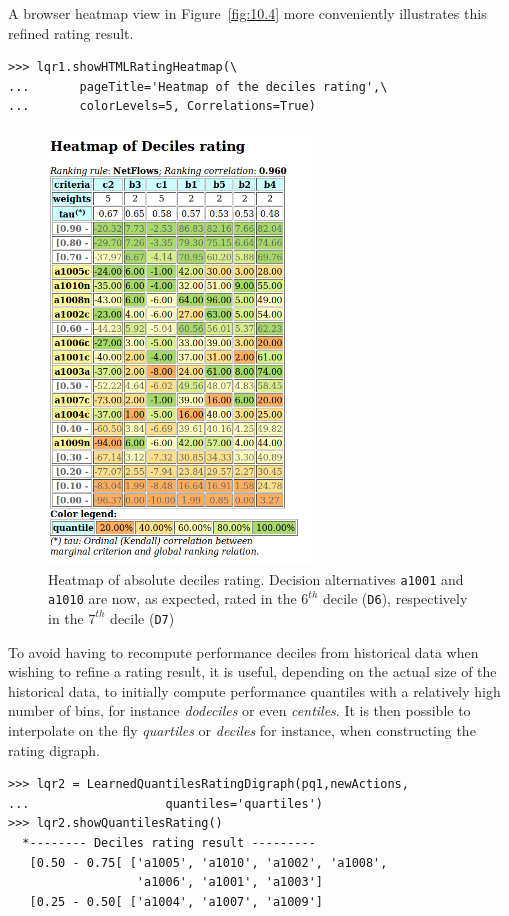 A browser heatmap view in Figure~\vref{fig:10.4} more conveniently illustrates this refined rating result.
\begin{lstlisting}
>>> lqr1.showHTMLRatingHeatmap(\
...       pageTitle='Heatmap of the deciles rating',\
...       colorLevels=5, Correlations=True)
\end{lstlisting}
\begin{figure}[ht]
\sidecaption[t]
\includegraphics[width=7cm]{Figures/10-4-heatMap2.png}
\caption[Heatmap of absolute deciles rating]{Heatmap of absolute deciles rating. Decision alternatives \texttt{a1001} and \texttt{a1010} are now, as expected, rated in the $6^{th}$ decile (\texttt{D6}), respectively in the $7^{th}$ decile (\texttt{D7})}
\label{fig:10.4}       %
\end{figure}

To avoid having to recompute performance deciles from historical data when wishing to refine a rating result, it is useful, depending on the actual size of the historical data, to initially compute performance quantiles with a relatively high number of bins, for instance \emph{dodeciles} or even \emph{centiles}. It is then possible to interpolate on the fly \emph{quartiles} or \emph{deciles} for instance, when constructing the rating digraph. 
\begin{lstlisting}[caption={From deciles interpolated quartiles rating result},label=list:10.10]
>>> lqr2 = LearnedQuantilesRatingDigraph(pq1,newActions,
...                   quantiles='quartiles')
>>> lqr2.showQuantilesRating()
  *-------- Deciles rating result ---------
   [0.50 - 0.75[ ['a1005', 'a1010', 'a1002', 'a1008',
                  'a1006', 'a1001', 'a1003']
   [0.25 - 0.50[ ['a1004', 'a1007', 'a1009']
\end{lstlisting}

